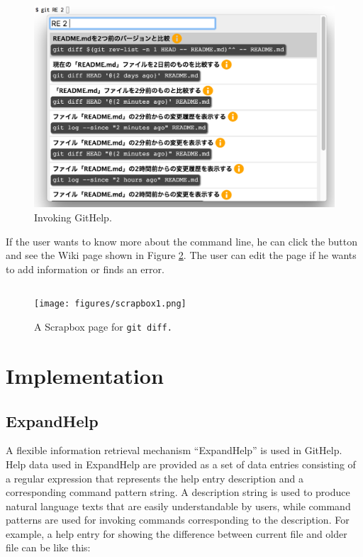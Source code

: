 \documentclass{sigchi}
\def\GH{\textsf{GitHelp}}
\def\SB{\textsf{Scrapbox}}
\def\EH{\textsf{ExpandHelp}}
\begin{document}
\begin{figure}[t]
  \includegraphics[width=12cm,bb=-100 -100 1190 766]{figures/githelp1.png}
  \caption{Invoking {\GH}.}
  \label{bash2}
\end{figure}

If the user wants to know more about the command line,
he can click the
button and see the Wiki page shown in Figure \ref{scrapboxpage}.
The user can edit the page if he wants to add information or finds an error.

\begin{figure}[b]
\begin{verbatim}
\end{verbatim}
\centerline{\texttt{[image: figures/scrapbox1.png]}}
\caption{A {\SB} page for \tt{git diff}.}
\label{scrapboxpage}
\end{figure}

\section{Implementation}

\subsection{ExpandHelp}

A flexible information retrieval mechanism ``{\EH}'' is used in {\GH}.
%
Help data used in {\EH} are provided as a set of data entries
consisting of a regular expression that represents the help entry description
and a corresponding command pattern string.
A description string is used to produce natural language texts
that are easily understandable by users,
while command patterns are used for invoking commands
corresponding to the description.
%
For example, a help entry for showing the difference between
current file and older file can be like this:
\end{document}
